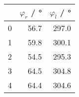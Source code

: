 \begin{tabular}{lrr}
\toprule
{} &  $\varphi_r$ / \si{\degree} &  $\varphi_l$ / \si{\degree} \\
\midrule
0 &                        56.7 &                       297.0 \\
1 &                        59.8 &                       300.1 \\
2 &                        54.5 &                       295.3 \\
3 &                        64.5 &                       304.8 \\
4 &                        64.4 &                       304.6 \\
\bottomrule
\end{tabular}
